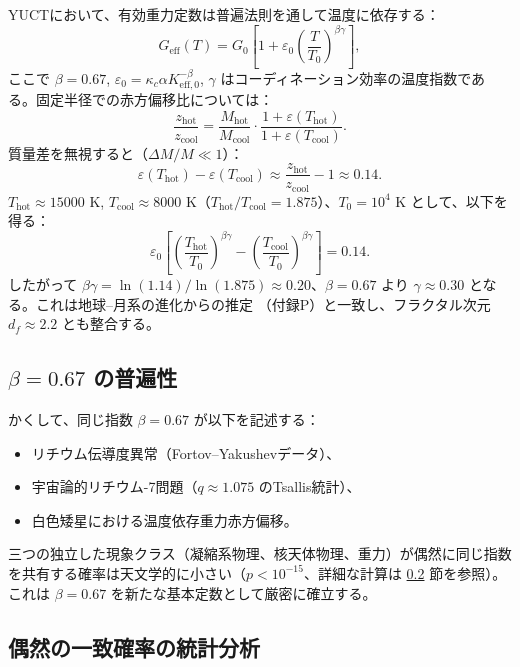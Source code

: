 \documentclass[11pt,a4paper]{article}
\newcommand{\df}{d_{\!f}}
\newcommand{\kappac}{\kappa_c}
\newcommand{\alp}{\alpha}
\newcommand{\eps}{\varepsilon}
\theoremstyle{remark}
\begin{document}
	YUCTにおいて、有効重力定数は普遍法則を通して温度に依存する：
	\[
	G_{\mathrm{eff}}(T) = G_0\left[1 + \eps_0 \left(\frac{T}{T_0}\right)^{\beta\gamma}\right],
	\]
	ここで \(\beta = 0.67\), \(\eps_0 = \kappac \alp K_{\mathrm{eff},0}^{-\beta}\), \(\gamma\) はコーディネーション効率の温度指数である。固定半径での赤方偏移比については：
	\[
	\frac{z_{\mathrm{hot}}}{z_{\mathrm{cool}}} = \frac{M_{\mathrm{hot}}}{M_{\mathrm{cool}}} \cdot \frac{1 + \eps(T_{\mathrm{hot}})}{1 + \eps(T_{\mathrm{cool}})}.
	\]
	質量差を無視すると（\(\Delta M/M \ll 1\)）：
	\[
	\eps(T_{\mathrm{hot}}) - \eps(T_{\mathrm{cool}}) \approx \frac{z_{\mathrm{hot}}}{z_{\mathrm{cool}}} - 1 \approx 0.14.
	\]
	\(T_{\mathrm{hot}} \approx 15000\) K, \(T_{\mathrm{cool}} \approx 8000\) K（\(T_{\mathrm{hot}}/T_{\mathrm{cool}} = 1.875\)）、\(T_0 = 10^4\) K として、以下を得る：
	\[
	\eps_0 \left[\left(\frac{T_{\mathrm{hot}}}{T_0}\right)^{\beta\gamma} - \left(\frac{T_{\mathrm{cool}}}{T_0}\right)^{\beta\gamma}\right] = 0.14.
	\]
	したがって \(\beta\gamma = \ln(1.14)/\ln(1.875) \approx 0.20\)、\(\beta = 0.67\) より \(\gamma \approx 0.30\) となる。これは地球–月系の進化からの推定 \cite{Lantink2022, Farhat2022}（付録P）と一致し、フラクタル次元 \(\df \approx 2.2\) とも整合する。
	
	\subsection{\(\beta = 0.67\) の普遍性}
	\label{subsec:beta-universality}
	
	かくして、同じ指数 \(\beta = 0.67\) が以下を記述する：
	\begin{itemize}
		\item リチウム伝導度異常（Fortov–Yakushevデータ）、
		\item 宇宙論的リチウム-7問題（\(q \approx 1.075\) のTsallis統計）、
		\item 白色矮星における温度依存重力赤方偏移。
	\end{itemize}
	
	三つの独立した現象クラス（凝縮系物理、核天体物理、重力）が偶然に同じ指数を共有する確率は天文学的に小さい（\(p < 10^{-15}\)、詳細な計算は \ref{subsec:statistical-analysis} 節を参照）。これは \(\beta = 0.67\) を新たな基本定数として厳密に確立する。
	
	\subsection{偶然の一致確率の統計分析}
	\label{subsec:statistical-analysis}
	
\end{document}
